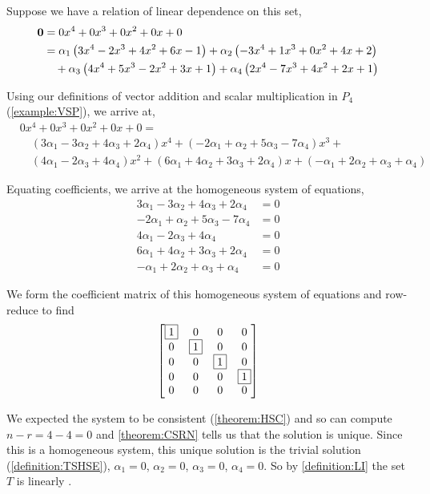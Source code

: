 \documentclass{ximera}
\begin{document}
\begin{example}
  Suppose we have a relation of linear dependence on this set,
  \begin{align*}
    \mathbf{0}&=0x^4+0x^3+0x^2+0x+0\\
               &=\alpha_1\left(3x^4-2x^3+4x^2+6x-1\right)+\alpha_2\left(-3x^4+1x^3+0x^2+4x+2\right)\\
               &\quad +\alpha_3\left(4x^4+5x^3-2x^2+3x+1\right)+\alpha_4\left(2x^4-7x^3+4x^2+2x+1\right)
  \end{align*}

  Using our definitions of vector addition and scalar multiplication in $P_4$ (\ref{example:VSP}), we arrive at,
  \begin{align*}
    &0x^4+0x^3+0x^2+0x+0=\\
    &\quad\left(3\alpha_1-3\alpha_2+4\alpha_3+2\alpha_4\right)x^4 + \left(-2\alpha_1+\alpha_2+5\alpha_3-7\alpha_4\right)x^3 +\ \\
    &\quad\left(4\alpha_1-2\alpha_3+4\alpha_4\right)x^2+\left(6\alpha_1+4\alpha_2+3\alpha_3+2\alpha_4\right)x + \left(-\alpha_1+2\alpha_2+\alpha_3+\alpha_4\right)
  \end{align*}

  Equating coefficients, we arrive at the homogeneous system of equations,
  \begin{align*}
    3\alpha_1-3\alpha_2+4\alpha_3+2\alpha_4&=0\\
    -2\alpha_1+\alpha_2+5\alpha_3-7\alpha_4&=0\\
    4\alpha_1-2\alpha_3+4\alpha_4&=0\\
    6\alpha_1+4\alpha_2+3\alpha_3+2\alpha_4&=0\\
    -\alpha_1+2\alpha_2+\alpha_3+\alpha_4&=0
  \end{align*}

  We form the coefficient matrix of this homogeneous system of equations and row-reduce to find
  \[
    \begin{bmatrix}
      \fbox{1} & 0 & 0 & 0\\
      0 & \fbox{1} & 0 & 0\\
      0 & 0 & \fbox{1} & 0\\
      0 & 0 & 0 & \fbox{1}\\
      0 & 0 & 0 & 0
    \end{bmatrix}
  \]

  We expected the system to be consistent (\ref{theorem:HSC}) and so
  can compute $n-r=4-4=0$ and \ref{theorem:CSRN} tells us that the
  solution is unique.  Since this is a homogeneous system, this unique
  solution is the trivial solution (\ref{definition:TSHSE}),
  $\alpha_1=0$, $\alpha_2=0$, $\alpha_3=0$, $\alpha_4=0$.  So by
  \ref{definition:LI} the set $T$ is linearly .


\end{example}
\end{document}
